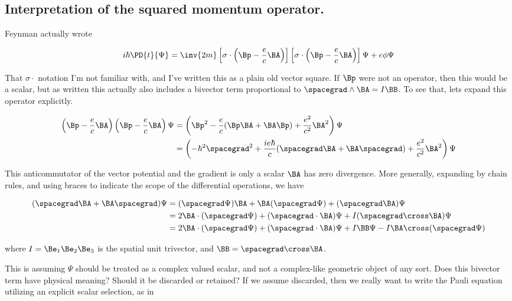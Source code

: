 \subsection{Interpretation of the squared momentum operator.}

Feynman actually wrote

\begin{align}\label{eqn:pauliFourier:1f}
i \hbar \PD{t}{\Psi} = \inv{2m} 
\left[\sigma \cdot \left( \Bp - \frac{e}{c} \BA \right)\right]
\left[\sigma \cdot \left( \Bp - \frac{e}{c} \BA \right)\right]
 \Psi + e \phi \Psi
\end{align}

That $\sigma \cdot$ notation I'm not familiar with, and I've written this as a plain old vector square.  If $\Bp$ were not an operator, then this would be a scalar, but as written this actually also includes a bivector term proportional to $\spacegrad \wedge \BA = I \BB$.  To see that, lets expand this operator explicitly.

\begin{align*}
\left( \Bp - \frac{e}{c} \BA \right) \left( \Bp - \frac{e}{c} \BA \right) \Psi 
&=
\left( \Bp^2 - \frac{e}{c} ( \Bp \BA + \BA \Bp ) + \frac{e^2}{c^2} \BA^2 \right) \Psi \\
&=
\left( - \hbar^2 \spacegrad^2 + \frac{i e \hbar }{c} ( \spacegrad \BA + \BA \spacegrad ) + \frac{e^2}{c^2} \BA^2 \right) \Psi \\
\end{align*}

This anticommutator of the vector potential and the gradient is only a scalar $\BA $ has zero divergence.  More generally, expanding by chain rules, and using braces to indicate the scope of the differential operations, we have

\begin{align*}
( \spacegrad \BA + \BA \spacegrad ) \Psi
&=
(\spacegrad \Psi) \BA + \BA (\spacegrad \Psi) + (\spacegrad \BA) \Psi \\
&=
2 \BA \cdot (\spacegrad \Psi) + (\spacegrad \cdot \BA) \Psi + I (\spacegrad \cross \BA) \Psi \\
&=
2 \BA \cdot (\spacegrad \Psi) + (\spacegrad \cdot \BA) \Psi + I \BB \Psi - I \BA \cross (\spacegrad \Psi) \\
\end{align*}

where $I = \Be_1 \Be_2 \Be_3$ is the spatial unit trivector, and $\BB = \spacegrad \cross \BA$.

This is assuming $\Psi$ should be treated as a complex valued scalar, and not a complex-like geometric object of any sort.  Does this bivector term have physical meaning?  Should it be discarded or retained?  If we assume discarded, then we really want to write the Pauli equation utilizing an explicit scalar selection, as in

